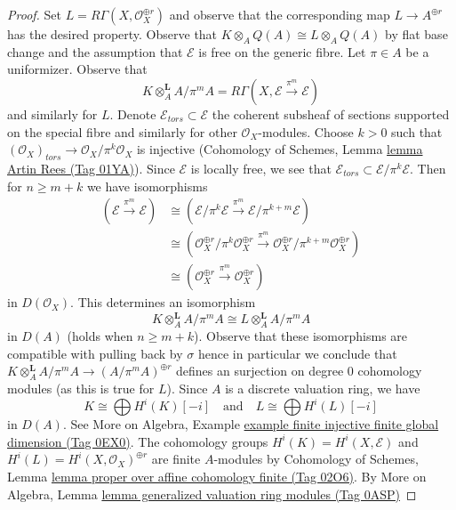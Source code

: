 \documentclass{amsart}
\theoremstyle{plain}
\theoremstyle{definition}
\theoremstyle{remark}
\numberwithin{equation}{subsection}
\begin{document}
\begin{proof}
\medskip\noindent
Set $L = R\Gamma(X, \mathcal{O}_X^{\oplus r})$ and observe that the
corresponding map $L \to A^{\oplus r}$ has the desired property.
Observe that $K \otimes_A Q(A) \cong L \otimes_A Q(A)$
by flat base change and the assumption that $\mathcal{E}$
is free on the generic fibre. Let $\pi \in A$ be a uniformizer. Observe that
$$
K \otimes_A^\mathbf{L} A/\pi^m A =
R\Gamma(X, \mathcal{E} \xrightarrow{\pi^m} \mathcal{E})
$$
and similarly for $L$.
Denote $\mathcal{E}_{tors} \subset \mathcal{E}$ the coherent subsheaf of
sections supported on the special fibre and similarly for other
$\mathcal{O}_X$-modules. Choose $k > 0$ such that
$(\mathcal{O}_X)_{tors} \to \mathcal{O}_X/\pi^k \mathcal{O}_X$
is injective (Cohomology of Schemes, Lemma \href{https://stacks.math.columbia.edu/tag/01YA}{lemma Artin Rees (Tag 01YA)}).
Since $\mathcal{E}$ is locally free, we see
that $\mathcal{E}_{tors} \subset \mathcal{E}/\pi^k\mathcal{E}$.
Then for $n \geq m + k$ we have isomorphisms
\begin{align*}
(\mathcal{E} \xrightarrow{\pi^m} \mathcal{E})
& \cong
(\mathcal{E}/\pi^k\mathcal{E} \xrightarrow{\pi^m}
\mathcal{E}/\pi^{k + m}\mathcal{E}) \\
& \cong
(\mathcal{O}_X^{\oplus r}/\pi^k\mathcal{O}_X^{\oplus r} \xrightarrow{\pi^m}
\mathcal{O}_X^{\oplus r}/\pi^{k + m}\mathcal{O}_X^{\oplus r}) \\
& \cong
(\mathcal{O}_X^{\oplus r} \xrightarrow{\pi^m} \mathcal{O}_X^{\oplus r})
\end{align*}
in $D(\mathcal{O}_X)$. This determines an isomorphism
$$
K \otimes_A^\mathbf{L} A/\pi^m A \cong L \otimes_A^\mathbf{L} A/\pi^m A
$$
in $D(A)$ (holds when $n \geq m + k$). Observe that these isomorphisms
are compatible with pulling back by $\sigma$ hence in particular
we conclude that
$K \otimes_A^\mathbf{L} A/\pi^m A \to (A/\pi^m A)^{\oplus r}$
defines an surjection on degree $0$ cohomology modules (as
this is true for $L$).
Since $A$ is a discrete valuation ring, we have
$$
K \cong \bigoplus H^i(K)[-i]
\quad\text{and}\quad
L \cong
\bigoplus H^i(L)[-i]
$$
in $D(A)$. See More on Algebra, Example
\href{https://stacks.math.columbia.edu/tag/0EX0}{example finite injective finite global dimension (Tag 0EX0)}.
The cohomology groups $H^i(K) = H^i(X, \mathcal{E})$ and
$H^i(L) = H^i(X, \mathcal{O}_X)^{\oplus r}$
are finite $A$-modules by Cohomology of Schemes, Lemma
\href{https://stacks.math.columbia.edu/tag/02O6}{lemma proper over affine cohomology finite (Tag 02O6)}.
By More on Algebra, Lemma
\href{https://stacks.math.columbia.edu/tag/0ASP}{lemma generalized valuation ring modules (Tag 0ASP)}

\end{proof}
\end{document}

